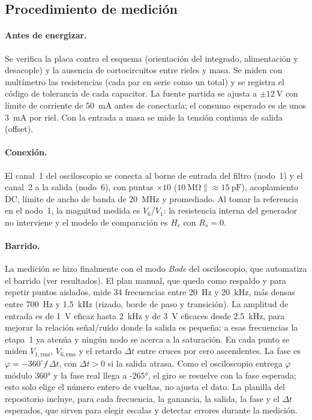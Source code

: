 \subsection{Procedimiento de medición}
\paragraph{Antes de energizar.} Se verifica la placa contra el esquema (orientación del integrado, alimentación y desacople) y la ausencia de
cortocircuitos entre rieles y masa. Se miden con multímetro las resistencias (cada par en serie como un total) y se registra el código de tolerancia de cada capacitor. La fuente
partida se ajusta a $\pm\qty{12}{\volt}$ con límite de corriente de \qty{50}{\milli\ampere} antes de conectarla; el consumo esperado es de unos
\qty{3}{\milli\ampere} por riel. Con la entrada a masa se mide la tensión continua de salida (offset).

\paragraph{Conexión.} El canal~1 del osciloscopio se conecta al borne de entrada del filtro (nodo~1) y el canal~2 a la salida (nodo~6), con puntas
$\times10$ ($\qty{10}{\mega\ohm}\parallel\approx\qty{15}{\pico\farad}$), acoplamiento DC, límite de ancho de banda de \qty{20}{\mega\hertz} y
promediado. Al tomar la referencia en el nodo~1, la magnitud medida es $V_6/V_1$: la resistencia interna del generador no interviene y el modelo de
comparación es $H_c$ con $R_s = 0$.

\paragraph{Barrido.} La medición se hizo finalmente con el modo \emph{Bode} del osciloscopio, que automatiza el barrido
(ver resultados). El plan manual, que queda como respaldo y para repetir puntos aislados, mide 34 frecuencias entre \qty{20}{\hertz} y \qty{20}{\kilo\hertz}, más densas entre \qty{700}{\hertz} y
\qty{1.5}{\kilo\hertz} (rizado, borde de paso y transición). La amplitud de entrada es de \qty{1}{\volt} eficaz hasta \qty{2}{\kilo\hertz} y de
\qty{3}{\volt} eficaces desde \qty{2.5}{\kilo\hertz}, para mejorar la relación señal/ruido donde la salida es pequeña: a esas frecuencias la
etapa~1 ya atenúa y ningún nodo se acerca a la saturación. En cada punto se miden $V_{1,\mathrm{rms}}$, $V_{6,\mathrm{rms}}$ y el retardo $\Delta t$
entre cruces por cero ascendentes. La fase es $\varphi = -360^\circ f\,\Delta t$, con $\Delta t > 0$ si la salida atrasa. Como el osciloscopio
entrega $\varphi$ módulo \ang{360} y la fase real llega a \ang{-265}, el giro se resuelve con la fase esperada; esto solo elige el número entero de
vueltas, no ajusta el dato. La planilla del repositorio incluye, para cada frecuencia, la ganancia, la salida, la fase y el $\Delta t$ esperados,
que sirven para elegir escalas y detectar errores durante la medición.

